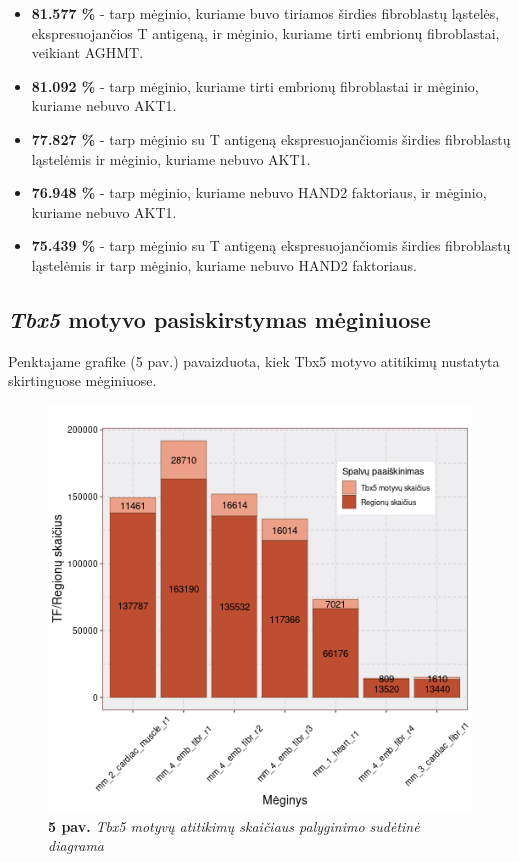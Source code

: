 \documentclass[12pt]{article}
\begin{document}
\begin{itemize}
    \item \textbf{81.577 \%} - tarp mėginio, kuriame buvo tiriamos širdies
        fibroblastų ląstelės, ekspresuojančios T antigeną, ir mėginio, kuriame
        tirti embrionų fibroblastai, veikiant AGHMT.
    \item \textbf{81.092 \%} - tarp mėginio, kuriame tirti embrionų
        fibroblastai ir mėginio, kuriame nebuvo AKT1.
    \item \textbf{77.827 \%} - tarp mėginio su T antigeną ekspresuojančiomis
        širdies fibroblastų ląstelėmis ir mėginio, kuriame nebuvo AKT1.
    \item \textbf{76.948 \%} - tarp mėginio, kuriame nebuvo HAND2 faktoriaus,
        ir mėginio, kuriame nebuvo AKT1.
    \item \textbf{75.439 \%} - tarp mėginio su T antigeną ekspresuojančiomis
        širdies fibroblastų ląstelėmis ir tarp mėginio, kuriame nebuvo HAND2
        faktoriaus.
  \end{itemize}


\subsection{\emph{Tbx5} motyvo pasiskirstymas mėginiuose}
Penktajame grafike (5 pav.) pavaizduota, kiek Tbx5 motyvo atitikimų nustatyta
skirtinguose mėginiuose.

\begin{figure}[htb]
    \begin{center}
        \includegraphics[width=0.6\linewidth]{../Figures/tf_hit_percentage.png}
        \caption*{\textbf{5 pav.} \emph{Tbx5 motyvų atitikimų skaičiaus
                  palyginimo sudėtinė diagrama}}
    \end{center}
\end{figure}
\end{document}
